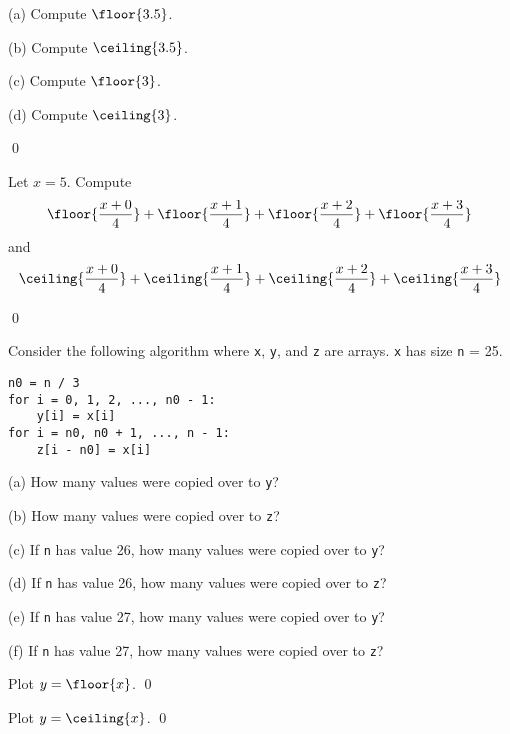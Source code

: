 \begin{ex}\mbox{}
\begin{tightlist}
\item[(a)] Compute $\floor{3.5}$.
\item[(b)] Compute $\ceiling{3.5}$.
\item[(c)] Compute $\floor{3}$.
\item[(d)] Compute $\ceiling{3}$.
\end{tightlist}
\qed
\end{ex}

\begin{ex}
Let $x = 5$.
Compute
\[
\floor{\frac{x + 0}{4}} 
+ \floor{\frac{x + 1}{4}}
+ \floor{\frac{x + 2}{4}}
+ \floor{\frac{x + 3}{4}}
\]
and
\[
\ceiling{\frac{x + 0}{4}} 
+ \ceiling{\frac{x + 1}{4}}
+ \ceiling{\frac{x + 2}{4}}
+ \ceiling{\frac{x + 3}{4}}
\]

\qed
\end{ex}


\begin{ex}
Consider the following algorithm where \verb!x!, \verb!y!, and \verb!z!
are arrays. \verb!x! has size \verb!n! = 25.
\begin{Verbatim}[frame=single,fontsize=\footnotesize]
n0 = n / 3
for i = 0, 1, 2, ..., n0 - 1:
    y[i] = x[i]
for i = n0, n0 + 1, ..., n - 1:
    z[i - n0] = x[i]
\end{Verbatim}
\begin{tightlist}
\item[(a)] How many values were copied over to \verb!y!?
\item[(b)] How many values were copied over to \verb!z!?
\item[(c)] If \verb!n! has value 26, 
how many values were copied over to \verb!y!?
\item[(d)] If \verb!n! has value 26,
how many values were copied over to \verb!z!?
\item[(e)] If \verb!n! has value 27, 
how many values were copied over to \verb!y!?
\item[(f)] If \verb!n! has value 27,
how many values were copied over to \verb!z!?
\end{tightlist}
\end{ex}


\begin{ex}
Plot $y = \floor{x}$.
\qed
\end{ex}

\begin{ex}
Plot $y = \ceiling{x}$.
\qed
\end{ex}




